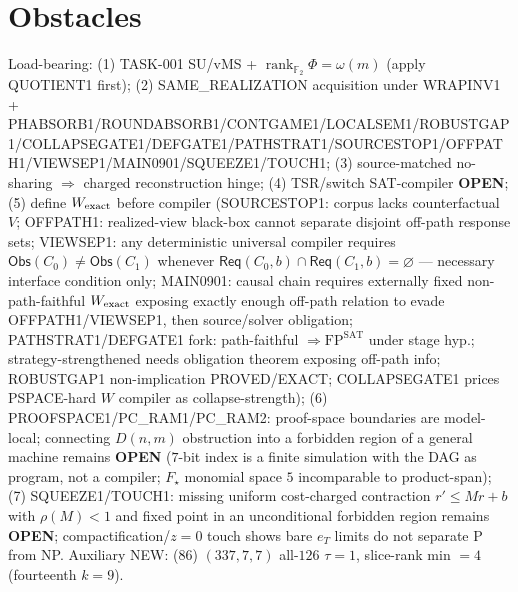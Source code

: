 \documentclass[11pt]{article}
\begin{document}
\section*{Obstacles}
Load-bearing: (1) TASK-001 SU/vMS + $\operatorname{rank}_{\mathbb F_2}\Phi=\omega(m)$ (apply QUOTIENT1 first);
(2) SAME\_REALIZATION acquisition under WRAPINV1 + PHABSORB1/ROUNDABSORB1/CONTGAME1/LOCALSEM1/ROBUSTGAP1/COLLAPSEGATE1/DEFGATE1/PATHSTRAT1/SOURCESTOP1/OFFPATH1/VIEWSEP1/MAIN0901/SQUEEZE1/TOUCH1;
(3) source-matched no-sharing $\Rightarrow$ charged reconstruction hinge;
(4) TSR/switch SAT-compiler \textbf{OPEN};
(5) define $W_{\rm exact}$ before compiler (SOURCESTOP1: corpus lacks counterfactual $V$;
OFFPATH1: realized-view black-box cannot separate disjoint off-path response sets;
VIEWSEP1: any deterministic universal compiler requires $\mathsf{Obs}(C_0)\ne\mathsf{Obs}(C_1)$
whenever $\mathsf{Req}(C_0,b)\cap\mathsf{Req}(C_1,b)=\varnothing$ --- necessary interface condition only;
MAIN0901: causal chain requires externally fixed non-path-faithful $W_{\rm exact}$ exposing
exactly enough off-path relation to evade OFFPATH1/VIEWSEP1, then source/solver obligation;
PATHSTRAT1/DEFGATE1 fork: path-faithful $\Rightarrow\mathrm{FP}^{\mathrm{SAT}}$ under stage hyp.;
strategy-strengthened needs obligation theorem exposing off-path info;
ROBUSTGAP1 non-implication PROVED/EXACT; COLLAPSEGATE1 prices PSPACE-hard $W$ compiler as collapse-strength);
(6) PROOFSPACE1/PC\_RAM1/PC\_RAM2: proof-space boundaries are model-local; connecting $D(n,m)$ obstruction into a
forbidden region of a general machine remains \textbf{OPEN} ($7$-bit index is a finite simulation with the DAG as program, not a compiler; $F_\star$ monomial space $5$ incomparable to product-span);
(7) SQUEEZE1/TOUCH1: missing uniform cost-charged contraction $r'\le Mr+b$ with $\rho(M)\lt 1$ and fixed point in an unconditional forbidden region remains \textbf{OPEN}; compactification/$z{=}0$ touch shows bare $e_T$ limits do not separate P from NP.
Auxiliary NEW: (86) $(337,7,7)$ all-$126$ $\tau{=}1$, slice-rank min $=4$ (fourteenth $k{=}9$).
\end{document}

